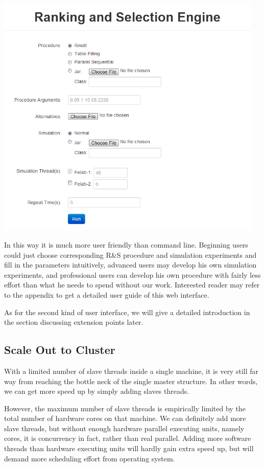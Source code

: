 \documentclass[12pt,a4]{report}
\begin{document}
\begin{center}
\includegraphics[width=128mm]{rase_web.png}
\end{center}

In this way it is much more user friendly than command line. Beginning users could just choose corresponding R\&S procedure and simulation experiments and fill in the parameters intuitively, advanced users may develop his own simulation experiments, and professional users can develop his own procedure with fairly less effort than what he needs to spend without our work. Interested reader may refer to the appendix to get a detailed user guide of this web interface.

As for the second kind of user interface, we will give a detailed introduction in the section discussing extension points later.

\subsection{Scale Out to Cluster}

With a limited number of slave threads inside a single machine, it is very still far way from reaching the bottle neck of the single master structure. In other words, we can get more speed up by simply adding slaves threads.

However, the maximum number of slave threads is empirically limited by the total number of hardware cores on that machine. We can definitely add more slave threads, but without enough hardware parallel executing units, namely cores, it is concurrency in fact, rather than real parallel. Adding more software threads than hardware executing units will hardly gain extra speed up, but will demand more scheduling effort from operating system.
\end{document}
